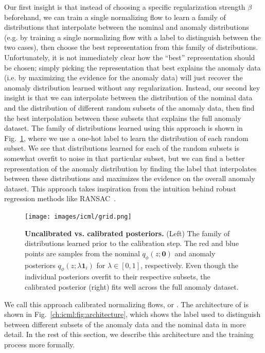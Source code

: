 Our first insight is that instead of choosing a specific regularization strength $\beta$ beforehand, we can train a single normalizing flow to learn a family of distributions that interpolate between the nominal and anomaly distributions (e.g. by training a single normalizing flow with a label to distinguish between the two cases), then choose the best representation from this family of distributions. Unfortunately, it is not immediately clear how the ``best'' representation should be chosen; simply picking the representation that best explains the anomaly data (i.e. by maximizing the evidence for the anomaly data) will just recover the anomaly distribution learned without any regularization. Instead, our second key insight is that we can interpolate between the distribution of the nominal data and the distribution of different random subsets of the anomaly data, then find the best interpolation between these subsets that explains the full anomaly dataset. The family of distributions learned using this approach is shown in Fig.~\ref{ch:icml:fig:grid}, where we use a one-hot label to learn the distribution of each random subset. We see that distributions learned for each of the random subsets is somewhat overfit to noise in that particular subset, but we can find a better representation of the anomaly distribution by finding the label that interpolates between these distributions and maximizes the evidence on the overall anomaly dataset. This approach takes inspiration from the intuition behind robust regression methods like RANSAC~\cite{fischlerRandomSampleConsensus1981}.

\begin{figure}[ht]
    \centering
    \texttt{[image: images/icml/grid.png]}
    \caption{\textbf{Uncalibrated vs. calibrated posteriors.} (Left) The family of distributions learned prior to the calibration step. The red and blue points are samples from the nominal $q_\phi(z; \mathbf{0})$ and anomaly posteriors $q_\phi(z; \lambda \mathbf{1}_i)$ for $\lambda \in [0, 1]$, respectively. Even though the individual posteriors overfit to their respective subsets, the calibrated posterior (right) fits well across the full anomaly dataset.}
    \label{ch:icml:fig:grid}
\end{figure}

We call this approach calibrated normalizing flows, or \ouralg{}. The architecture of \ouralg{} is shown in Fig.~\ref{ch:icml:fig:architecture}, which shows the label used to distinguish between different subsets of the anomaly data and the nominal data in more detail. In the rest of this section, we describe this architecture and the training process more formally.

